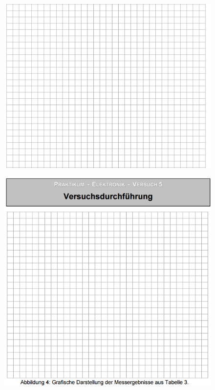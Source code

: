 \begin{figure}[!h]
\begin{center}
\includegraphics[scale=0.8]{Text}
\end{center}
\end{figure}
\begin{figure}[!ht]
\begin{center}
\includegraphics[scale=0.8]{Graph2}
\end{center}
\end{figure}
\clearpage
